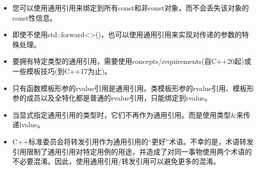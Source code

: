\begin{itemize}
	\item 您可以使用通用引用来绑定到所有const和非const对象，而不会丢失该对象的const性信息。
	\item 即使不使用std::forward<>()，也可以使用通用引用来实现对传递的参数的特殊处理。
	\item 要拥有特定类型的通用引用，需要使用concepts/requirements(自C++20起)或一些模板技巧(到C++17为止)。
	\item 只有函数模板形参的rvalue引用是通用引用。类模板形参的rvalue引用、模板形参的成员以及全特化都是普通的rvalue引用，只能绑定到rvalue。
	\item 当显式指定通用引用的类型时，它们不再作为通用引用。而是使用类型\&来传递lvalue。
	\item C++标准委员会将转发引用作为通用引用的“更好”术语。不幸的是，术语转发引用限制了通用引用对特定用例的用途，并造成了对同一事物使用两个术语的不必要混淆。因此，使用通用引用/转发引用可以避免更多的混淆。
\end{itemize}


\newpage